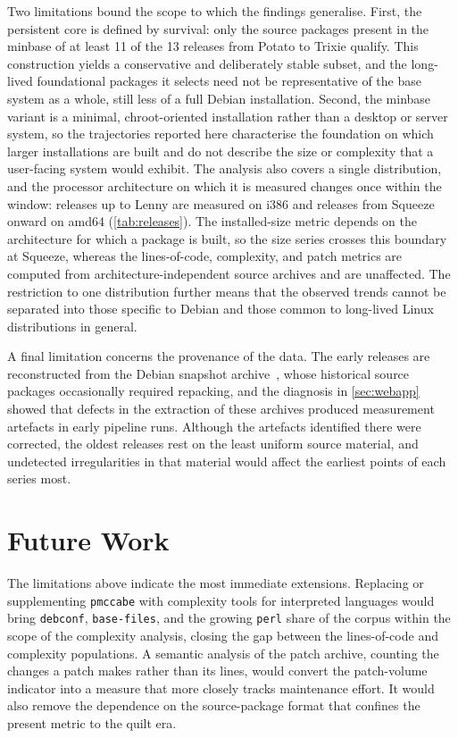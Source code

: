 Two limitations bound the scope to which the findings generalise. First, the persistent core is defined by survival: only the source packages present in the minbase of at least 11 of the 13 releases from Potato to Trixie qualify. This construction yields a conservative and deliberately stable subset, and the long-lived foundational packages it selects need not be representative of the base system as a whole, still less of a full Debian installation. Second, the minbase variant is a minimal, chroot-oriented installation rather than a desktop or server system, so the trajectories reported here characterise the foundation on which larger installations are built and do not describe the size or complexity that a user-facing system would exhibit. The analysis also covers a single distribution, and the processor architecture on which it is measured changes once within the window: releases up to Lenny are measured on i386 and releases from Squeeze onward on amd64 (\autoref{tab:releases}). The installed-size metric depends on the architecture for which a package is built, so the size series crosses this boundary at Squeeze, whereas the lines-of-code, complexity, and patch metrics are computed from architecture-independent source archives and are unaffected. The restriction to one distribution further means that the observed trends cannot be separated into those specific to Debian and those common to long-lived Linux distributions in general.

A final limitation concerns the provenance of the data. The early releases are reconstructed from the Debian snapshot archive~\cite{debianSnapshot}, whose historical source packages occasionally required repacking, and the diagnosis in \autoref{sec:webapp} showed that defects in the extraction of these archives produced measurement artefacts in early pipeline runs. Although the artefacts identified there were corrected, the oldest releases rest on the least uniform source material, and undetected irregularities in that material would affect the earliest points of each series most.

\section{Future Work}
\label{sec:future-work}

The limitations above indicate the most immediate extensions. Replacing or supplementing \texttt{pmccabe} with complexity tools for interpreted languages would bring \texttt{debconf}, \texttt{base-files}, and the growing \texttt{perl} share of the corpus within the scope of the complexity analysis, closing the gap between the lines-of-code and complexity populations. A semantic analysis of the patch archive, counting the changes a patch makes rather than its lines, would convert the patch-volume indicator into a measure that more closely tracks maintenance effort. It would also remove the dependence on the source-package format that confines the present metric to the quilt era.

